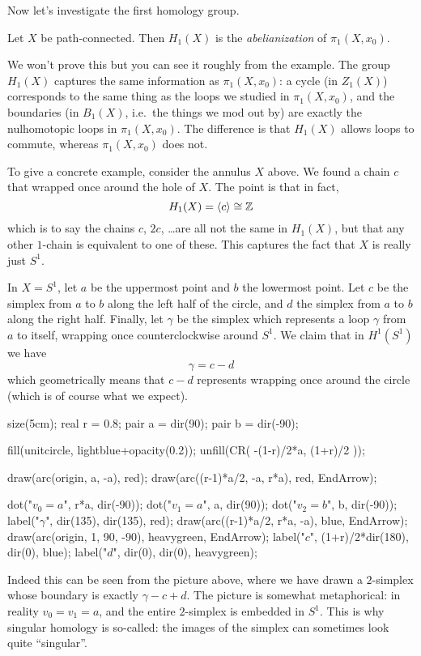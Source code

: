 Now let's investigate the first homology group.
\begin{theorem}
	Let $X$ be path-connected.
	Then $H_1(X)$ is the \emph{abelianization} of $\pi_1(X, x_0)$.
\end{theorem}
We won't prove this but you can see it roughly from the example.
The group $H_1(X)$ captures the same information
as $\pi_1(X, x_0)$: a cycle (in $Z_1(X)$) corresponds to the same thing
as the loops we studied in $\pi_1(X, x_0)$,
and the boundaries (in $B_1(X)$, i.e.\ the things we mod out by)
are exactly the nulhomotopic loops in $\pi_1(X, x_0)$.
The difference is that $H_1(X)$ allows loops to commute,
whereas $\pi_1(X, x_0)$ does not.
\begin{example}
	To give a concrete example, consider the annulus $X$ above.
	We found a chain $c$ that wrapped once around the hole of $X$.
	The point is that in fact,
	\[ H_1(X) = \left< c\right> \cong \mathbb Z \]
	which is to say the chains $c$, $2c$, \dots are all not the same in $H_1(X)$,
	but that any other $1$-chain is equivalent to one of these.
	This captures the fact that $X$ is really just $S^1$.
\end{example}
\begin{example}
	\label{ex:S1_c_minus_d}
	In $X = S^1$, let $a$ be the uppermost point and $b$ the lowermost point.
	Let $c$ be the simplex from $a$ to $b$ along the left half of the circle,
	and $d$ the simplex from $a$ to $b$ along the right half.
	Finally, let $\gamma$ be the simplex which represents a loop $\gamma$ from $a$
	to itself, wrapping once counterclockwise around $S^1$.
	We claim that in $H^1(S^1)$ we have
	\[ \gamma = c - d \]
	which geometrically means that $c-d$ represents wrapping once around
	the circle (which is of course what we expect).

	\begin{center}
		\begin{asy}
			size(5cm);
			real r = 0.8;
			pair a = dir(90);
			pair b = dir(-90);

			fill(unitcircle, lightblue+opacity(0.2));
			unfill(CR( -(1-r)/2*a, (1+r)/2 ));

			draw(arc(origin, a, -a), red);
			draw(arc((r-1)*a/2, -a, r*a), red, EndArrow);

			dot("$v_0=a$", r*a, dir(-90));
			dot("$v_1=a$", a, dir(90));
			dot("$v_2=b$", b, dir(-90));
			label("$\gamma$", dir(135), dir(135), red);
			draw(arc((r-1)*a/2, r*a, -a), blue, EndArrow);
			draw(arc(origin, 1, 90, -90), heavygreen, EndArrow);
			label("$c$", (1+r)/2*dir(180), dir(0), blue);
			label("$d$", dir(0), dir(0), heavygreen);
		\end{asy}
	\end{center}

	Indeed this can be seen from the picture above, where we have drawn
	a $2$-simplex whose boundary is exactly $\gamma - c + d$.
	The picture is somewhat metaphorical: in reality $v_0 = v_1 = a$,
	and the entire $2$-simplex is embedded in $S^1$.
	This is why singular homology is so-called: the images of the simplex
	can sometimes look quite ``singular''.
\end{example}


